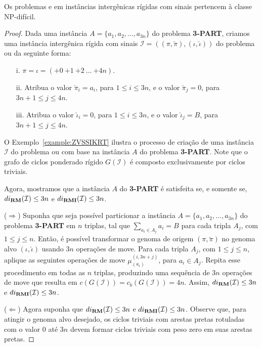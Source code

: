 \begin{theorem}\label{theorem:FETVDCDT}
Os problemas \SbIRM{} e \SbIRMI{} em instâncias intergênicas rígidas com sinais pertencem à classe NP-difícil.
\end{theorem}
\begin{proof}
Dada uma instância $A=\{a_1,a_2,\dots,a_{3n}\}$ do problema \textbf{3-PART}, criamos uma instância intergênica rígida com sinais $\mathcal{I} = ((\pi,\breve\pi ),(\iota,\breve\iota))$ do problema \SbIRM{} ou \SbIRMI{} da seguinte forma:
\begin{itemize}
    \item[i.] $\pi = \iota = ({+0}~{+1}~{+2}~\dots~{+4n})$.
    \item[ii.] Atribua o valor $\breve\pi_i = a_i$, para $1 \le i \le 3n$, e o valor $\breve\pi_j = 0$, para $3n+1 \le j \le 4n$.
    \item[iii.] Atribua o valor $\breve\iota_i = 0$, para $1 \le i \le 3n$, e o valor $\breve\iota_j = B$, para $3n+1 \le j \le 4n$.
\end{itemize}

O Exemplo~\ref{example:ZVSSIKRT} ilustra o processo de criação de uma instância $\mathcal{I}$ do problema \SbIRM{} ou \SbIRMI{} com base na instância $A$ do problema \textbf{3-PART}. Note que o grafo de ciclos ponderado rígido $G(\mathcal{I})$ é composto exclusivamente por ciclos triviais.



Agora, mostramos que a instância $A$ do \textbf{3-PART} é satisfeita se, e somente se, \break$di_{\textbf{RM}}(\mathcal{I}) \le 3n$ e $di_{\textbf{RMI}}(\mathcal{I}) \le 3n$.

($\Rightarrow$) Suponha que seja possível particionar a instância $A=\{a_1,a_2,\dots,a_{3n}\}$ do problema \textbf{3-PART} em $n$ triplas, tal que $\sum_{a_i \in A_j} a_i = B$ para cada tripla $A_j$, com $1\le j \le n$. Então, é possível transformar o genoma de origem $(\pi, \breve\pi)$ no genoma alvo $(\iota, \breve\iota)$ usando $3n$ operações de move. Para cada tripla $A_j$, com $1\le j \le n$, aplique as seguintes operações de move $\mu_{(a_i)}^{(i,3n+j)}$, para $a_i \in A_j$. Repita esse procedimento em todas as $n$ triplas, produzindo uma sequência de $3n$ operações de move que resulta em $c(G(\mathcal{I})) = c_b(G(\mathcal{I})) = 4n$. Assim, $di_{\textbf{RM}}(\mathcal{I}) \le 3n$ e $di_{\textbf{RMI}}(\mathcal{I}) \le 3n$.

($\Leftarrow$) Agora suponha que $di_{\textbf{RM}}(\mathcal{I}) \le 3n$ e $di_{\textbf{RMI}}(\mathcal{I}) \le 3n$. Observe que, para atingir o genoma alvo desejado, os ciclos triviais com arestas pretas rotuladas com o valor $0$ até $3n$ devem formar ciclos triviais com peso zero em suas arestas pretas.


\end{proof}
